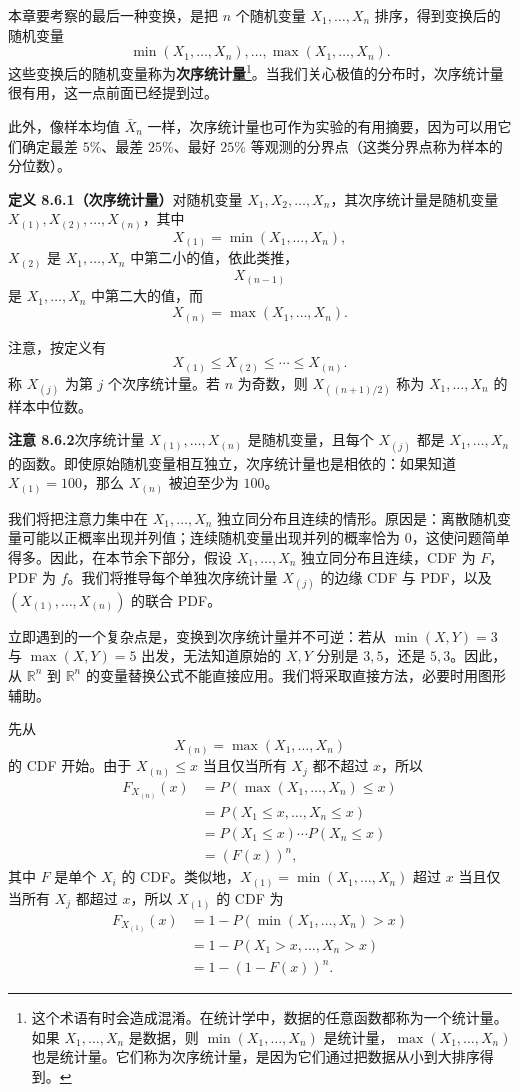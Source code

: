 \documentclass[UTF8, 12pt, fontset=fandol, oneside]{ctexart}
\begin{document}
本章要考察的最后一种变换，是把 $n$ 个随机变量 $X_1,\ldots,X_n$ 排序，得到变换后的随机变量
\[
  \min(X_1,\ldots,X_n),\ldots,\max(X_1,\ldots,X_n).
\]
这些变换后的随机变量称为\textbf{次序统计量}\footnote{这个术语有时会造成混淆。在统计学中，数据的任意函数都称为一个统计量。如果 $X_1,\ldots,X_n$ 是数据，则 $\min(X_1,\ldots,X_n)$ 是统计量，$\max(X_1,\ldots,X_n)$ 也是统计量。它们称为次序统计量，是因为它们通过把数据从小到大排序得到。}。当我们关心极值的分布时，次序统计量很有用，这一点前面已经提到过。

此外，像样本均值 $\bar X_n$ 一样，次序统计量也可作为实验的有用摘要，因为可以用它们确定最差 $5\%$、最差 $25\%$、最好 $25\%$ 等观测的分界点（这类分界点称为样本的分位数）。

\noindent\textbf{定义 8.6.1（次序统计量）}\quad 对随机变量 $X_1,X_2,\ldots,X_n$，其次序统计量是随机变量 $X_{(1)},X_{(2)},\ldots,X_{(n)}$，其中
\[
  X_{(1)}=\min(X_1,\ldots,X_n),
\]
$X_{(2)}$ 是 $X_1,\ldots,X_n$ 中第二小的值，依此类推，
\[
  X_{(n-1)}
\]
是 $X_1,\ldots,X_n$ 中第二大的值，而
\[
  X_{(n)}=\max(X_1,\ldots,X_n).
\]

注意，按定义有
\[
  X_{(1)}\le X_{(2)}\le\cdots\le X_{(n)}.
\]
称 $X_{(j)}$ 为第 $j$ 个次序统计量。若 $n$ 为奇数，则 $X_{((n+1)/2)}$ 称为 $X_1,\ldots,X_n$ 的样本中位数。

\noindent\textbf{注意 8.6.2}\quad 次序统计量 $X_{(1)},\ldots,X_{(n)}$ 是随机变量，且每个 $X_{(j)}$ 都是 $X_1,\ldots,X_n$ 的函数。即使原始随机变量相互独立，次序统计量也是相依的：如果知道 $X_{(1)}=100$，那么 $X_{(n)}$ 被迫至少为 $100$。

我们将把注意力集中在 $X_1,\ldots,X_n$ 独立同分布且连续的情形。原因是：离散随机变量可能以正概率出现并列值；连续随机变量出现并列的概率恰为 $0$，这使问题简单得多。因此，在本节余下部分，假设 $X_1,\ldots,X_n$ 独立同分布且连续，CDF 为 $F$，PDF 为 $f$。我们将推导每个单独次序统计量 $X_{(j)}$ 的边缘 CDF 与 PDF，以及 $(X_{(1)},\ldots,X_{(n)})$ 的联合 PDF。

立即遇到的一个复杂点是，变换到次序统计量并不可逆：若从 $\min(X,Y)=3$ 与 $\max(X,Y)=5$ 出发，无法知道原始的 $X,Y$ 分别是 $3,5$，还是 $5,3$。因此，从 $\mathbb R^n$ 到 $\mathbb R^n$ 的变量替换公式不能直接应用。我们将采取直接方法，必要时用图形辅助。

先从
\[
  X_{(n)}=\max(X_1,\ldots,X_n)
\]
的 CDF 开始。由于 $X_{(n)}\le x$ 当且仅当所有 $X_j$ 都不超过 $x$，所以
\[
\begin{aligned}
  F_{X_{(n)}}(x)
  &=P(\max(X_1,\ldots,X_n)\le x)\\
  &=P(X_1\le x,\ldots,X_n\le x)\\
  &=P(X_1\le x)\cdots P(X_n\le x)\\
  &=(F(x))^n,
\end{aligned}
\]
其中 $F$ 是单个 $X_i$ 的 CDF。类似地，$X_{(1)}=\min(X_1,\ldots,X_n)$ 超过 $x$ 当且仅当所有 $X_j$ 都超过 $x$，所以 $X_{(1)}$ 的 CDF 为
\[
\begin{aligned}
  F_{X_{(1)}}(x)
  &=1-P(\min(X_1,\ldots,X_n)>x)\\
  &=1-P(X_1>x,\ldots,X_n>x)\\
  &=1-(1-F(x))^n.
\end{aligned}
\]
\end{document}
